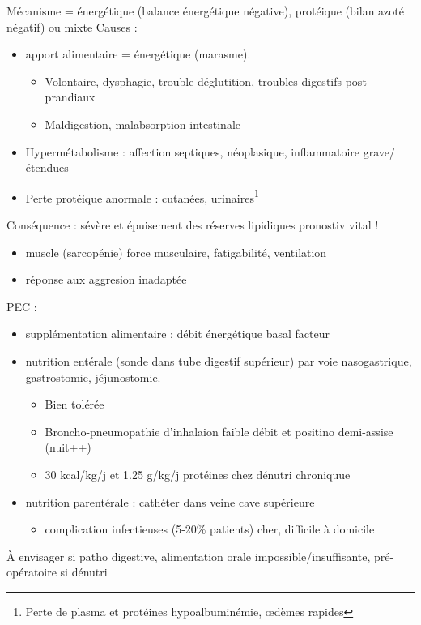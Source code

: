 \documentclass[11pt]{article}
\begin{document}
Mécanisme = énergétique (balance énergétique négative), protéique (bilan azoté
  négatif) ou mixte
Causes : 
\begin{itemize}
\item \dec apport alimentaire = énergétique (marasme). 
\begin{itemize}
\item Volontaire, dysphagie, trouble déglutition, troubles digestifs
post-prandiaux
\item Maldigestion, malabsorption intestinale
\end{itemize}
\item Hypermétabolisme : affection septiques, néoplasique, inflammatoire
grave/étendues
\item Perte protéique anormale : cutanées, urinaires\footnote{Perte de plasma et protéines \thus hypoalbuminémie, \oe{}dèmes rapides}
\end{itemize}

Conséquence : sévère et épuisement des réserves lipidiques \thus pronostiv vital
!
\begin{itemize}
\item muscle (sarcopénie) \thus \dec force musculaire, \inc fatigabilité, \dec
ventilation
\item réponse aux aggresion inadaptée
\end{itemize}

PEC : 
\begin{itemize}
\item supplémentation alimentaire : débit énergétique basal \texttimes{} facteur
\item nutrition entérale (sonde dans tube digestif supérieur) par voie
nasogastrique, gastrostomie, jéjunostomie. 
\begin{itemize}
\item Bien tolérée
\item Broncho-pneumopathie d'inhalaion \thus faible débit et positino demi-assise
(nuit++)
\item 30 kcal/kg/j et 1.25 g/kg/j protéines chez dénutri chroniquue
\end{itemize}
\item nutrition parentérale : cathéter dans veine cave supérieure
\begin{itemize}
\item complication infectieuses (5-20\% patients) cher, difficile à domicile
\end{itemize}
\end{itemize}
À envisager si patho digestive, alimentation orale impossible/insuffisante,
pré-opératoire si dénutri
\end{document}
